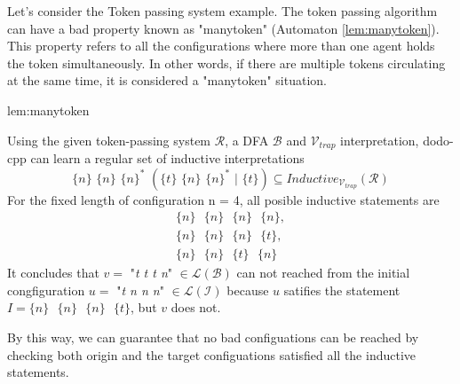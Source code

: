 Let's consider the Token passing system example. 
The token passing algorithm can have a bad property known as "manytoken" (Automaton \ref{lem:manytoken}). 
This property refers to all the configurations where more than one agent holds the token simultaneously. 
In other words, if there are multiple tokens circulating at the same time, it is considered a "manytoken" situation.

\begin{lem}{lem:manytoken}
\end{lem}

Using the given token-passing system $\mathcal{R}$, a DFA $\mathcal{B}$ and $\mathcal{V}_{trap}$ interpretation, dodo-cpp can learn a 
regular set of inductive interpretations 
\[
    \{n\} \,\, \{n\} \,\, \{n\}^* \,\, (\{t\} \,\, \{n\} \,\, \{n\}^* \,\, | \,\, \{t\}) \subseteq Inductive_{\mathcal{V}_{trap}}(\mathcal{R})    
\] 
For the fixed length of configuration n = 4, all posible inductive statements are
\begin{gather*}
    \lbrace n \rbrace\,\,\,\, \lbrace n \rbrace \,\,\,\,  \lbrace n \rbrace \,\,\,\, \lbrace n \rbrace,\\
    \lbrace n \rbrace\,\,\,\, \lbrace n \rbrace \,\,\,\,  \lbrace n \rbrace \,\,\,\, \lbrace t \rbrace,\\
    \lbrace n \rbrace\,\,\,\, \lbrace n \rbrace \,\,\,\,  \lbrace t \rbrace \,\,\,\, \lbrace n \rbrace
\end{gather*}
It concludes that $v = $ "\textit{t t t n}" $\in \mathcal{L}(\mathcal{B})$ can not reached from the initial congfiguration
$u = $ "\textit{t n n n}" $\in \mathcal{L}(\mathcal{I})$ because $u$ satifies the statement
$I = \lbrace n \rbrace\,\,\,\, \lbrace n \rbrace \,\,\,\,  \lbrace n \rbrace \,\,\,\, \lbrace t \rbrace$,
but $v$ does not.

By this way, we can guarantee that no bad configuations can be reached
by checking both origin and the target configuations satisfied all
the inductive statements.

